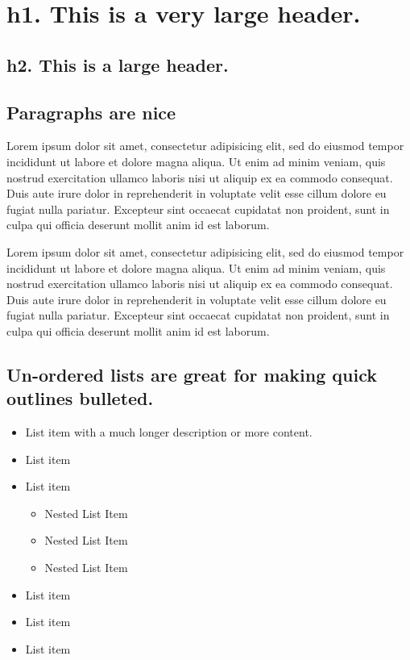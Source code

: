 \section*{ h1. This is a very large header. }

\subsection*{ h2. This is a large header. }

\subsection*{ Paragraphs are nice }

\par\addvspace{\medskipamount}\noindent             Lorem ipsum dolor sit amet, consectetur adipisicing elit, sed do eiusmod            tempor incididunt ut labore et dolore magna aliqua. Ut enim ad minim veniam,            quis nostrud exercitation ullamco laboris nisi ut aliquip ex ea commodo            consequat. Duis aute irure dolor in reprehenderit in voluptate velit esse            cillum dolore eu fugiat nulla pariatur. Excepteur sint occaecat cupidatat non            proident, sunt in culpa qui officia deserunt mollit anim id est laborum.

\par\addvspace{\medskipamount}\noindent Lorem ipsum dolor sit amet, consectetur adipisicing elit, sed do eiusmod          tempor incididunt ut labore et dolore magna aliqua. Ut enim ad minim veniam,          quis nostrud exercitation ullamco laboris nisi ut aliquip ex ea commodo          consequat. Duis aute irure dolor in reprehenderit in voluptate velit esse          cillum dolore eu fugiat nulla pariatur. Excepteur sint occaecat cupidatat non          proident, sunt in culpa qui officia deserunt mollit anim id est laborum.

\subsection*{ Un-ordered lists are great for making quick outlines bulleted. }

\begin{itemize}                \item List item with a much longer description or more content.             \item List item             \item List item              \begin{itemize}                    \item Nested List Item                 \item Nested List Item                 \item Nested List Item              \end{itemize}                         \item List item             \item List item             \item List item          \end{itemize}

